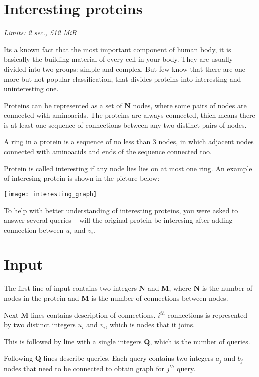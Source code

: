 \documentclass [11pt, a4paper, oneside, notitlepage] {article}
\begin{document}
\section*{Interesting proteins}
\hspace{1cm}
\emph{Limits: 2 sec., 512 MiB}
\bigskip

Its a known fact that the most important component of human body, it is basically the building material of every cell in your body. They are usually divided into two groups: simple and complex. But few know that there are one more but not popular classification, that divides proteins into interesting and uninteresting one.

Proteins can be represented as a set of $\mathbf{N}$ nodes, where some pairs of nodes are connected with aminoacids. The proteins are always connected, thich means there is at least one sequence of connections between any two distinct pairs of nodes.

A ring in a protein is a sequence of no less than 3 nodes, in which adjacent nodes connected with aminoacids and ends of the sequence connected too.

Protein is called interesting if any node lies lies on at most one ring. An example of interesing protein is shown in the picture below:

\texttt{[image: interesting\_graph]}

To help with better understanding of interesting proteins, you were asked to answer several queries -- will the original protein be interesing after adding connection between $u_i$ and $v_i$.

\section*{Input}

The first line of input contains two integers $\mathbf{N}$ and $\mathbf{M}$, where $\mathbf{N}$ is the number of nodes in the protein and $\mathbf{M}$ is the number of connections between nodes.

Next $\mathbf{M}$ lines contains description of connections. $i^{th}$ connections is represented by two distinct integers $u_i$ and $v_i$, which is nodes that it joins.

This is followed by line with a single integers $\mathbf{Q}$, which is the number of queries.

Following $\mathbf{Q}$ lines describe queries. Each query contains two integers $a_j$ and $b_j$ -- nodes that need to be connected to obtain graph for $j^{th}$ query.
\end{document}
